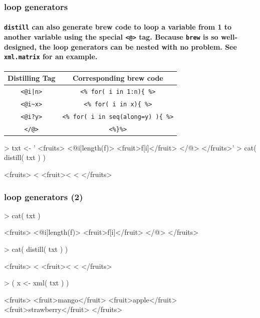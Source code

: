 \documentclass[smaller]{beamer}
\newcommand{\rfun}[1]{\texttt{#1}}
\begin{document}
\begin{frame}[fragile]
\frametitle{loop generators}
\framesubtitle{\rfun{distill} can also generate brew code to loop a variable from 1 to another variable using the special \texttt{<@>} tag. Because \rfun{brew} is so well-designed, the loop generators can be nested with no problem. See \rfun{xml.matrix} for an example.}

\begin{table}
 \centering
\begin{tabular}{|c|c|}
\hline
Distilling Tag & Corresponding brew code\\
\hline
\texttt{<@i|n>} & \texttt{<\% for( i in 1:n)\{ \%>}\\
\texttt{<@i\~{}x>} & \texttt{<\% for( i in x)\{ \%>}\\
\texttt{<@i?y>} & \texttt{<\% for( i in seq(along=y) )\{ \%>}\\
\hline
\texttt{</@>} & \texttt{<\%\}\%>}\\
\hline
\end{tabular}
\end{table}

\begin{Schunk}
\begin{Sinput}
> txt <- ' <fruits>
      <@i|length(f)>
        <fruit>{f[i]}</fruit>
      </@>
    </fruits>'
> cat( distill( txt ) )
\end{Sinput}
\begin{Soutput}
 <fruits>
    <%
      <fruit><%
    <%
  </fruits>
\end{Soutput}
\end{Schunk}
 
\end{frame}

\begin{frame}[fragile]
 \frametitle{loop generators (2)}
\begin{Schunk}
\begin{Sinput}
> cat( txt )
\end{Sinput}
\begin{Soutput}
 <fruits>
    <@i|length(f)>
      <fruit>{f[i]}</fruit>
    </@>
  </fruits>
\end{Soutput}
\begin{Sinput}
> cat( distill( txt ) )
\end{Sinput}
\begin{Soutput}
 <fruits>
    <%
      <fruit><%
    <%
  </fruits>
\end{Soutput}
\begin{Sinput}
> ( x <- xml( txt ) )
\end{Sinput}
\begin{Soutput}
<fruits>
 <fruit>mango</fruit>
 <fruit>apple</fruit>
 <fruit>strawberry</fruit>
</fruits>
\end{Soutput}
\end{Schunk}
\end{frame}
\end{document}
